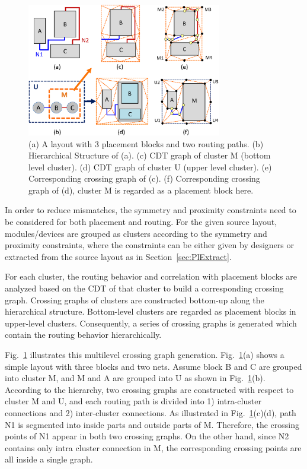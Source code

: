     \begin{figure}[t]
      \begin{center}
      \includegraphics[width=8.5cm]{Fig/HIER.eps}
      \caption{
         (a) A layout with 3 placement blocks and two routing paths. 
         (b) Hierarchical Structure of (a).
         (c) CDT graph of cluster M (bottom level cluster).
         (d) CDT graph of cluster U (upper level cluster).
         (e) Corresponding crossing graph of (c).
         (f) Corresponding crossing graph of (d), cluster M is regarded as a placement block here.
        }
      \label{fig:HIER}
      \end{center}
    \end{figure}

    In order to reduce mismatches, the symmetry and proximity constraints need to be considered for both placement and routing. 
    For the given source layout, modules/devices are grouped as clusters according to the symmetry and proximity constraints, 
    where the constraints can be either given by designers or extracted from the source layout as in Section~\ref{sec:PlExtract}.

    For each cluster, the routing behavior and correlation with placement blocks are analyzed based on the CDT of that cluster to build a corresponding crossing graph. 
    Crossing graphs of clusters are constructed bottom-up along the hierarchical structure. 
    Bottom-level clusters are regarded as placement blocks in upper-level clusters. 
    Consequently, a series of crossing graphs is generated which contain the routing behavior hierarchically.

    Fig.~\ref{fig:HIER} illustrates this multilevel crossing graph generation.
    Fig.~\ref{fig:HIER}(a) shows a simple layout with three blocks and two nets.
    Assume block B and C are grouped into cluster M, and M and A are grouped into U as shown in Fig.~\ref{fig:HIER}(b).
    According to the hierarchy, two crossing graphs are constructed with respect to cluster M and U, and
    each routing path is divided into 1) intra-cluster connections and 2) inter-cluster connections. 
    As illustrated in Fig.~\ref{fig:HIER}(c)(d), path N1 is segmented into inside parts and outside parts of M. 
    Therefore, the crossing points of N1 appear in both two crossing graphs. 
    On the other hand, since N2 contains only intra cluster connection in M, the corresponding crossing points are all inside a single graph. 

    


